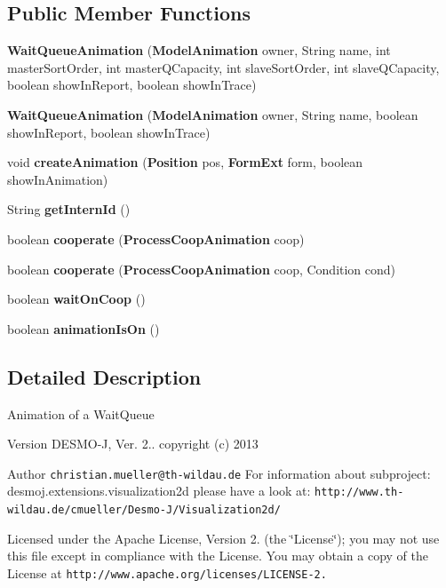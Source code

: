 \subsection*{Public Member Functions}
\begin{DoxyCompactItemize}
\item 
{\bf Wait\-Queue\-Animation} ({\bf Model\-Animation} owner, String name, int master\-Sort\-Order, int master\-Q\-Capacity, int slave\-Sort\-Order, int slave\-Q\-Capacity, boolean show\-In\-Report, boolean show\-In\-Trace)
\item 
{\bf Wait\-Queue\-Animation} ({\bf Model\-Animation} owner, String name, boolean show\-In\-Report, boolean show\-In\-Trace)
\item 
void {\bf create\-Animation} ({\bf Position} pos, {\bf Form\-Ext} form, boolean show\-In\-Animation)
\item 
String {\bf get\-Intern\-Id} ()
\item 
boolean {\bf cooperate} ({\bf Process\-Coop\-Animation} coop)
\item 
boolean {\bf cooperate} ({\bf Process\-Coop\-Animation} coop, Condition cond)
\item 
boolean {\bf wait\-On\-Coop} ()
\item 
boolean {\bfseries animation\-Is\-On} ()\label{classdesmoj_1_1extensions_1_1visualization2d_1_1animation_1_1core_1_1advanced_modelling_features_1_1_wait_queue_animation_a15698d3308f22cf8dd14ac836f45e2d4}

\end{DoxyCompactItemize}


\subsection{Detailed Description}
Animation of a Wait\-Queue

\begin{DoxyVersion}{Version}
D\-E\-S\-M\-O-\/\-J, Ver. 2.. copyright (c) 2013 
\end{DoxyVersion}
\begin{DoxyAuthor}{Author}
{\tt christian.\-mueller@th-\/wildau.\-de} For information about subproject\-: desmoj.\-extensions.\-visualization2d please have a look at\-: {\tt http\-://www.\-th-\/wildau.\-de/cmueller/\-Desmo-\/\-J/\-Visualization2d/}
\end{DoxyAuthor}
Licensed under the Apache License, Version 2. (the \char`\"{}\-License\char`\"{}); you may not use this file except in compliance with the License. You may obtain a copy of the License at {\tt http\-://www.\-apache.\-org/licenses/\-L\-I\-C\-E\-N\-S\-E-\/2.}

